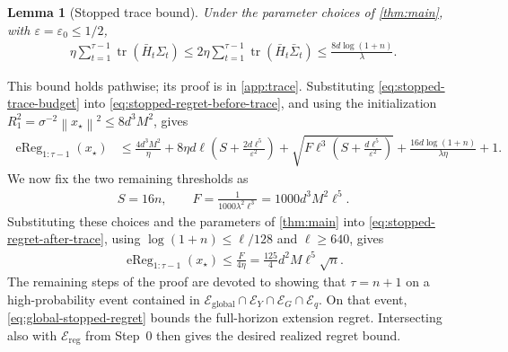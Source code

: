 \documentclass{article}
\newtheorem{lemma}[lemma]{Lemma}
\newcommand{\tr}{\operatorname{tr}}
\newcommand{\1}{\mathbf 1}
\newcommand{\eps}{\varepsilon}
\newcommand{\norm}[1]{\left\lVert #1\right\rVert}
\begin{document}
\begin{lemma}[Stopped trace bound]
    \label{lem:stopped-trace}
    Under the parameter choices of \cref{thm:main}, with $\eps=\eps_0\leq1/2$,
    \begin{align}
        \eta\sum_{t=1}^{\tau-1}\tr(\bar H_t\Sigma_t)
        \leq
        2\eta\sum_{t=1}^{\tau-1}\tr(\bar H_t\bar\Sigma_t)
        \leq\frac{8d\log(1+n)}{\lambda}.
        \label{eq:stopped-trace-budget}
    \end{align}
\end{lemma}
This bound holds pathwise; its proof is in \cref{app:trace}.
Substituting \eqref{eq:stopped-trace-budget} into
\eqref{eq:stopped-regret-before-trace}, and using the initialization
$R_1^2=\sigma^{-2}\norm{x_\star}^2\leq8d^3M^2$, gives
\begin{align}
    \operatorname{eReg}_{1:\tau-1}(x_\star)
     & \leq
    \frac{4d^3M^2}{\eta}
    +8\eta d\ell\left(S+\frac{2d\ell^5}{\eps^2}\right)
    +\sqrt{F\ell^3\left(S+\frac{d\ell^5}{\eps^2}\right)}
    +\frac{16d\log(1+n)}{\lambda\eta}+1.
    \label{eq:stopped-regret-after-trace}
\end{align}
We now fix the two remaining thresholds as
\begin{align}
    S=16n,
    \qquad
    F=\frac{1}{1000\lambda^2\ell^3}
    =1000d^3M^2\ell^5.
    \label{eq:global-threshold-choices}
\end{align}
Substituting these choices and the parameters of \cref{thm:main} into
\eqref{eq:stopped-regret-after-trace}, using
$\log(1+n)\leq\ell/128$ and $\ell\geq640$, gives
\begin{align}
    \operatorname{eReg}_{1:\tau-1}(x_\star)
    \leq\frac{F}{4\eta}
    =\frac{125}{4}d^2M\ell^5\sqrt n.
    \label{eq:global-stopped-regret}
\end{align}
The remaining steps of the proof are devoted to showing that $\tau=n+1$
on a high-probability event contained in
$\mathcal E_{\mathrm{global}}\cap\mathcal E_Y\cap\mathcal E_G\cap\mathcal E_q$.
On that event, \eqref{eq:global-stopped-regret} bounds the full-horizon
extension regret. Intersecting also with $\mathcal E_{\mathrm{reg}}$ from
Step~0 then gives the desired realized regret bound.
\end{document}

